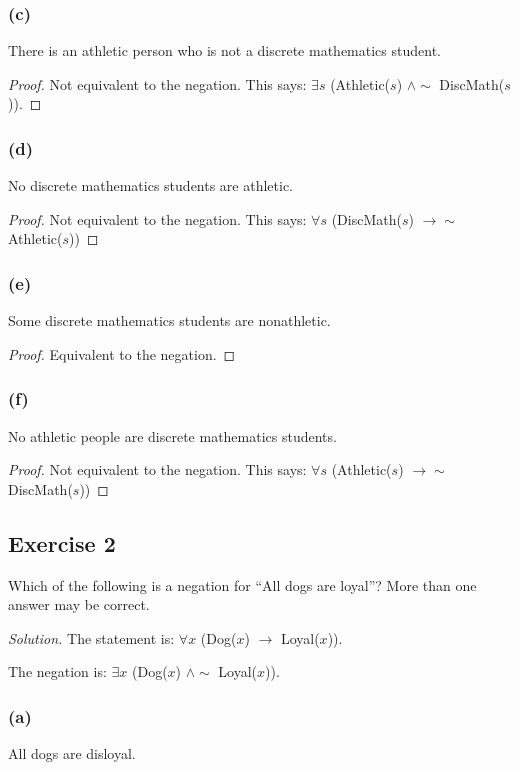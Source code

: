 \documentclass[14pt]{extarticle}
\newcommand{\fa}{\forall}
\newcommand{\te}{\exists}
\begin{document}
\subsubsection{(c)}
There is an athletic person who is not a discrete mathematics student.

\begin{proof}
Not equivalent to the negation. This says: $\te s$ (Athletic($s$) $\wedge \sim$ DiscMath($s$)).
\end{proof}

\subsubsection{(d)}
No discrete mathematics students are athletic.

\begin{proof}
Not equivalent to the negation. This says: $\fa s$ (DiscMath($s$) $\to \sim$ Athletic($s$))
\end{proof}

\subsubsection{(e)}
Some discrete mathematics students are nonathletic.

\begin{proof}
Equivalent to the negation.
\end{proof}

\subsubsection{(f)}
No athletic people are discrete mathematics students.

\begin{proof}
Not equivalent to the negation. This says: $\fa s$ (Athletic($s$) $\to \sim$ DiscMath($s$))
\end{proof}

\subsection{Exercise 2}
Which of the following is a negation for “All dogs are loyal”? More than one answer may be correct.

{\it Solution.} The statement is: $\fa x$ (Dog($x$) $\to$ Loyal($x$)).

The negation is: $\te x$ (Dog($x$) $\wedge \sim$ Loyal($x$)).

\subsubsection{(a)}
All dogs are disloyal.
\end{document}

